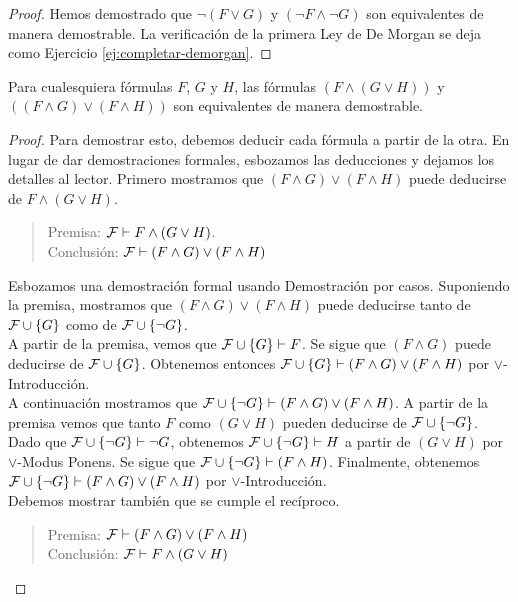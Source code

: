 \documentclass[12pt,a4paper]{book}
\begin{document}
\begin{proof}
        Hemos demostrado que $\neg(F\vee G)$ y $(\neg F\wedge\neg G)$ son equivalentes de manera demostrable. La verificación de
        la primera Ley de De Morgan se deja como Ejercicio \ref{ej:completar-demorgan}.
    \end{proof}

    \begin{proposicion}\label{prop:distributividad-and-demostrable}
        Para cualesquiera fórmulas $F$, $G$ y $H$, las fórmulas $(F\wedge(G\vee H))$ y $((F\wedge G)\vee(F\wedge H))$ son
        equivalentes de manera demostrable.
    \end{proposicion}
    \begin{proof}
        Para demostrar esto, debemos deducir cada fórmula a partir de la otra. En lugar de dar demostraciones formales,
        esbozamos las deducciones y dejamos los detalles al lector. Primero mostramos que $(F\wedge G)\vee(F\wedge H)$ puede
        deducirse de $F\wedge(G\vee H)$.

        \begin{quote}
            Premisa: $\mathcal{F}\vdash F\wedge(G\vee H)$.\\
            Conclusión: $\mathcal{F}\vdash(F\wedge G)\vee(F\wedge H)$
        \end{quote}

        Esbozamos una demostración formal usando Demostración por casos. Suponiendo la premisa, mostramos que
        $(F\wedge G)\vee(F\wedge H)$ puede deducirse tanto de $\mathcal{F}\cup\{G\}$ como de $\mathcal{F}\cup\{\neg G\}$.\\
        A partir de la premisa, vemos que $\mathcal{F}\cup\{G\}\vdash F$. Se sigue que $(F\wedge G)$ puede deducirse de $\mathcal{F}\cup\{G\}$.
        Obtenemos entonces $\mathcal{F}\cup\{G\}\vdash(F\wedge G)\vee(F\wedge H)$ por $\vee$-Introducción.\\
        A continuación mostramos que $\mathcal{F}\cup\{\neg G\}\vdash(F\wedge G)\vee(F\wedge H)$. A partir de la premisa vemos que tanto
        $F$ como $(G\vee H)$ pueden deducirse de $\mathcal{F}\cup\{\neg G\}$. Dado que $\mathcal{F}\cup\{\neg G\}\vdash\neg G$, obtenemos
        $\mathcal{F}\cup\{\neg G\}\vdash H$ a partir de $(G\vee H)$ por $\vee$-Modus Ponens. Se sigue que
        $\mathcal{F}\cup\{\neg G\}\vdash(F\wedge H)$. Finalmente, obtenemos $\mathcal{F}\cup\{\neg G\}\vdash(F\wedge G)\vee(F\wedge H)$ por
        $\vee$-Introducción.\\
        Debemos mostrar también que se cumple el recíproco.

        \begin{quote}
            Premisa: $\mathcal{F}\vdash(F\wedge G)\vee(F\wedge H)$\\
            Conclusión: $\mathcal{F}\vdash F\wedge(G\vee H)$
        \end{quote}


\end{proof}
\end{document}
